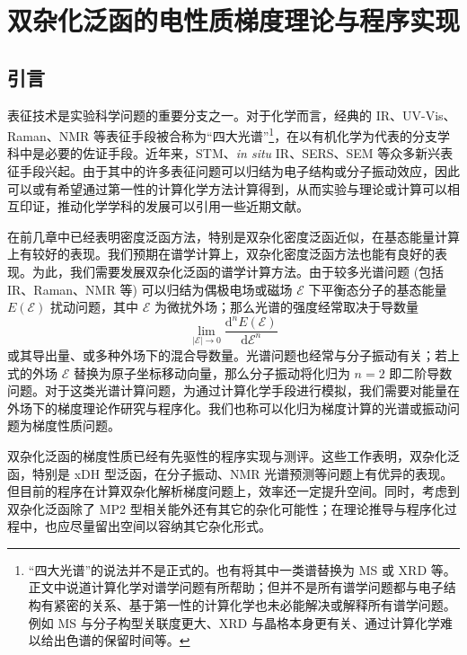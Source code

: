 
\chapter{双杂化泛函的电性质梯度理论与程序实现}

\section{引言}

表征技术是实验科学问题的重要分支之一。对于化学而言，经典的 IR、UV-Vis、Raman、NMR 等表征手段被合称为“四大光谱”\footnote{“四大光谱”的说法并不是正式的。也有将其中一类谱替换为 MS 或 XRD 等。正文中说道计算化学对谱学问题有所帮助；但并不是所有谱学问题都与电子结构有紧密的关系、基于第一性的计算化学也未必能解决或解释所有谱学问题。例如 MS 与分子构型关联度更大、XRD 与晶格本身更有关、通过计算化学难以给出色谱的保留时间等。}，在以有机化学为代表的分支学科中是必要的佐证手段。近年来，STM、\emph{in situ} IR、SERS、SEM 等众多新兴表征手段兴起。由于其中的许多表征问题可以归结为电子结构或分子振动效应，因此可以或有希望通过第一性的计算化学方法计算得到，从而实验与理论或计算可以相互印证，推动化学学科的发展\alert{可以引用一些近期文献}。

在前几章中已经表明密度泛函方法，特别是双杂化密度泛函近似，在基态能量计算上有较好的表现。我们预期在谱学计算上，双杂化密度泛函方法也能有良好的表现。为此，我们需要发展双杂化泛函的谱学计算方法。由于较多光谱问题 (包括 IR、Raman、NMR 等) 可以归结为偶极电场或磁场 $\pmb{\mathcal{E}}$ 下平衡态分子的基态能量 $E(\pmb{\mathcal{E}})$ 扰动问题，其中 $\pmb{\mathcal{E}}$ 为微扰外场；那么光谱的强度经常取决于导数量
\begin{equation}
  \lim_{|\pmb{\mathcal{E}}| \rightarrow 0} \frac{\mathrm{d}^n E(\pmb{\mathcal{E}})}{\mathrm{d} \pmb{\mathcal{E}}^n}
\end{equation}
或其导出量、或多种外场下的混合导数量。光谱问题也经常与分子振动有关；若上式的外场 $\pmb{\mathcal{E}}$ 替换为原子坐标移动向量，那么分子振动将化归为 $n = 2$ 即二阶导数问题。对于这类光谱计算问题，为通过计算化学手段进行模拟，我们需要对能量在外场下的梯度理论作研究与程序化。我们也称可以化归为梯度计算的光谱或振动问题为\textsf{梯度性质}问题。

双杂化泛函的梯度性质已经有先驱性的程序实现与测评\cite{Neese-Grimme.JCP.2007, Biczysko-Barone.JCTC.2010, Su-Xu.JCC.2013, Stoychev-Neese.JCTC.2018, Gu-Xu.JCTC.2021, Yan-Xu.JCTC.2022}。这些工作表明，双杂化泛函，特别是 xDH 型泛函，在分子振动、NMR 光谱预测等问题上有优异的表现。但目前的程序在计算双杂化解析梯度问题上，效率还一定提升空间。同时，考虑到双杂化泛函除了 MP2 型相关能外还有其它的杂化可能性；在理论推导与程序化过程中，也应尽量留出空间以容纳其它杂化形式。

